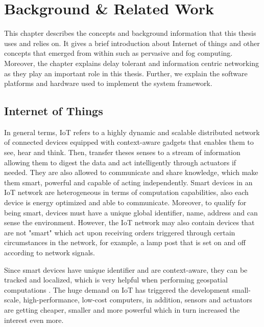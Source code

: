 
\chapter{Background \& Related Work}\label{chapter:background}

This chapter describes the concepts and background information that this thesis uses and relies on. It gives a brief introduction about Internet of things and other concepts that emerged from within such as pervasive and fog computing. Moreover, the chapter explains delay tolerant and information centric networking as they play an important role in this thesis. Further, we explain the software platforms and hardware used to implement the system framework.

\section{Internet of Things}

In general terms, IoT refers to a highly dynamic and scalable distributed network of connected devices equipped with context-aware gadgets that enables them to see, hear and think\cite{DAC:DAC2417}. Then, transfer theses senses to a stream of information allowing them to digest the data and act intelligently through actuators if needed. They are also allowed to communicate and share knowledge, which make them smart, powerful and capable of acting independently. Smart devices in an IoT network are heterogeneous in terms of computation capabilities, also each device is energy optimized and able to communicate. Moreover, to qualify for being smart, devices must have a unique global identifier, name, address and can sense the environment. However, the IoT network may also contain devices that are not "smart" which act upon receiving orders triggered through certain circumstances in the network, for example, a lamp post that is set on and off according to network signals. 

Since smart devices have unique identifier and are context-aware, they can be tracked and localized, which is very helpful when performing geospatial computations \cite{Miorandi20121497}. The huge demand on IoT has triggered the development small-scale, high-performance, low-cost computers, in addition, sensors and actuators are getting cheaper, smaller and more powerful which in turn increased the interest even more.
 

